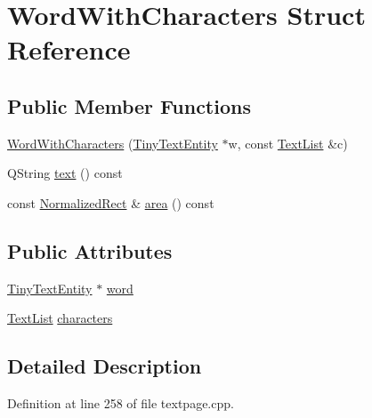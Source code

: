 \hypertarget{structWordWithCharacters}{\section{Word\+With\+Characters Struct Reference}
\label{structWordWithCharacters}
}
\subsection*{Public Member Functions}
\begin{DoxyCompactItemize}
\item 
\hyperlink{structWordWithCharacters_a49693d84ab4e9cf72b7f43bc18133a07}{Word\+With\+Characters} (\hyperlink{classTinyTextEntity}{Tiny\+Text\+Entity} $\ast$w, const \hyperlink{namespaceOkular_ae9075ed4d543c119d2e86fae7fc6cf46}{Text\+List} \&c)
\item 
Q\+String \hyperlink{structWordWithCharacters_a1b3ebffacb443679d8cab087eb746fc6}{text} () const 
\item 
const \hyperlink{classOkular_1_1NormalizedRect}{Normalized\+Rect} \& \hyperlink{structWordWithCharacters_a07f71a679787e2833924ea971adb33ea}{area} () const 
\end{DoxyCompactItemize}
\subsection*{Public Attributes}
\begin{DoxyCompactItemize}
\item 
\hyperlink{classTinyTextEntity}{Tiny\+Text\+Entity} $\ast$ \hyperlink{structWordWithCharacters_a689319e02faa2a486854f6f4b21d074f}{word}
\item 
\hyperlink{namespaceOkular_ae9075ed4d543c119d2e86fae7fc6cf46}{Text\+List} \hyperlink{structWordWithCharacters_ada5bed4a3fda83185d4719374f59733d}{characters}
\end{DoxyCompactItemize}


\subsection{Detailed Description}


Definition at line 258 of file textpage.\+cpp.



